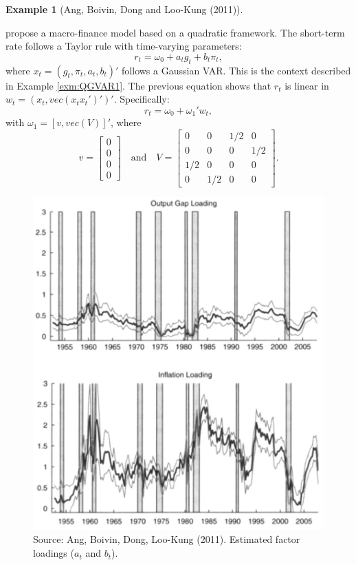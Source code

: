 \documentclass[
  12pt,
]{book}
\theoremstyle{definition}
\theoremstyle{definition}
\newtheorem{example}{Example}[chapter]
\theoremstyle{definition}
\theoremstyle{definition}
\theoremstyle{remark}
\begin{document}
\begin{example}[Ang, Boivin, Dong and Loo-Kung (2011)]
\protect\hypertarget{exm:Angetal2011}{}\label{exm:Angetal2011}

\citet{Ang_Boivin_Dong_LooKung_2011} propose a macro-finance model based on a quadratic framework. The short-term rate follows a Taylor rule with time-varying parameters:
\[
r_t = \omega_0 + a_t g_t + b_t \pi_t,
\]
where \(x_t=(g_t,\pi_t,a_t,b_t)'\) follows a Gaussian VAR. This is the context described in Example \ref{exm:QGVAR1}. The previous equation shows that \(r_t\) is linear in \(w_t = (x_t,vec(x_t x_t')')'\). Specifically:
\[
r_t = \omega_0 + \omega_1'w_t,
\]
with \(\omega_1 = [v,vec(V)]'\), where
\[
v = \left[
\begin{array}{c}
0\\
0\\
0\\
0
\end{array}
\right] \quad \mbox{and} \quad V = \left[
\begin{array}{cccc}
0 & 0& 1/2&0\\
0& 0& 0&1/2\\
1/2& 0& 0&0\\
0&1/2 &0 &0
\end{array}
\right].
\]

\begin{figure}

{\centering \includegraphics[width=0.7\linewidth]{figures/Ang_Boivin_loadings} 

}

\caption{Source: Ang, Boivin, Dong, Loo-Kung (2011). Estimated factor loadings ($a_t$ and $b_t$).}\label{fig:AngBoivin}
\end{figure}

\end{example}
\end{document}
